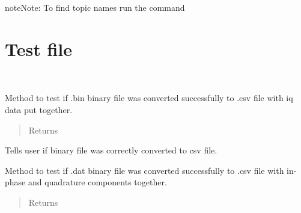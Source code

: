\documentclass[letterpaper,10pt,english]{sphinxmanual}
\begin{document}
\begin{sphinxadmonition}{note}{Note:}
To find topic names run the command 
\end{sphinxadmonition}


\section{Test file}
\label{\detokenize{Test:module-test}}\label{\detokenize{Test:test-file}}\label{\detokenize{Test::doc}}

\begin{fulllineitems}
\label{\detokenize{Test:test.TestParser}}~

\begin{fulllineitems}
\label{\detokenize{Test:test.TestParser.test_TI}}
Method to test if .bin binary file was converted successfully to .csv file with iq data put together.
\begin{quote}\begin{description}
\item[{Returns}] \leavevmode


\end{description}\end{quote}

Tells user if binary file was correctly converted to csv file.

\end{fulllineitems}


\begin{fulllineitems}
\label{\detokenize{Test:test.TestParser.test_iq}}
Method to test if .dat binary file was converted successfully to .csv file with in-phase and quadrature
components together.
\begin{quote}\begin{description}
\item[{Returns}] \leavevmode



\end{description}
\end{quote}
\end{fulllineitems}
\end{fulllineitems}
\end{document}
